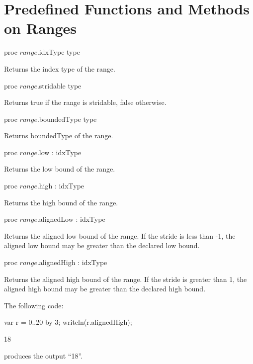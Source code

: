 \section{Predefined Functions and Methods on Ranges}
\begin{protohead}
proc $range$.idxType type
\end{protohead}
\begin{protobody}
Returns the index type of the range.
\end{protobody}

\begin{protohead}
proc $range$.stridable type
\end{protohead}
\begin{protobody}
Returns true if the range is stridable, false otherwise.
\end{protobody}

\begin{protohead}
proc $range$.boundedType type
\end{protohead}
\begin{protobody}
Returns boundedType of the range.
\end{protobody}

\begin{protohead}
proc $range$.low : idxType
\end{protohead}
\begin{protobody}
Returns the low bound of the range.
\end{protobody}

\begin{protohead}
proc $range$.high : idxType
\end{protohead}
\begin{protobody}
Returns the high bound of the range.
\end{protobody}

\begin{protohead}
proc $range$.alignedLow : idxType
\end{protohead}
\begin{protobody}
Returns the aligned low bound of the range.  If the stride is less than -1, the
aligned low bound may be greater than the declared low bound.
\end{protobody}

\begin{protohead}
proc $range$.alignedHigh : idxType
\end{protohead}
\begin{protobody}
Returns the aligned high bound of the range.  If the stride is greater than 1,
the aligned high bound may be greater than the declared high bound.
\end{protobody}
\begin{example}
The following code:
\begin{chapelpre}
\end{chapelpre}
\begin{chapel}
var r = 0..20 by 3;
writeln(r.alignedHigh);
\end{chapel}
\begin{chapeloutput}
18
\end{chapeloutput}
produces the output ``18''.
\end{example}

